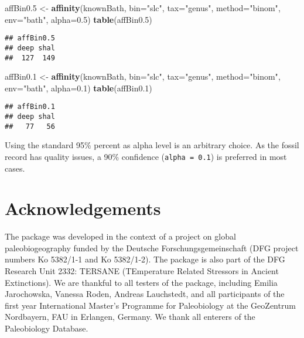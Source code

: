 \documentclass[]{article}
\newenvironment{Shaded}{\begin{snugshade}}{\end{snugshade}}
\newcommand{\KeywordTok}[1]{\textcolor[rgb]{0.13,0.29,0.53}{\textbf{{#1}}}}
\newcommand{\DataTypeTok}[1]{\textcolor[rgb]{0.13,0.29,0.53}{{#1}}}
\newcommand{\FloatTok}[1]{\textcolor[rgb]{0.00,0.00,0.81}{{#1}}}
\newcommand{\StringTok}[1]{\textcolor[rgb]{0.31,0.60,0.02}{{#1}}}
\newcommand{\NormalTok}[1]{{#1}}
\begin{document}
\begin{Shaded}
\begin{Highlighting}[]
\NormalTok{affBin0}\FloatTok{.5} \NormalTok{<-}\StringTok{ }\KeywordTok{affinity}\NormalTok{(knownBath, }\DataTypeTok{bin=}\StringTok{"slc"}\NormalTok{, }\DataTypeTok{tax=}\StringTok{"genus"}\NormalTok{, }
  \DataTypeTok{method=}\StringTok{"binom"}\NormalTok{, }\DataTypeTok{env=}\StringTok{"bath"}\NormalTok{, }\DataTypeTok{alpha=}\FloatTok{0.5}\NormalTok{)}
\KeywordTok{table}\NormalTok{(affBin0}\FloatTok{.5}\NormalTok{)}
\end{Highlighting}
\end{Shaded}

\begin{verbatim}
## affBin0.5
## deep shal 
##  127  149
\end{verbatim}

\begin{Shaded}
\begin{Highlighting}[]
\NormalTok{affBin0}\FloatTok{.1} \NormalTok{<-}\StringTok{ }\KeywordTok{affinity}\NormalTok{(knownBath, }\DataTypeTok{bin=}\StringTok{"slc"}\NormalTok{, }\DataTypeTok{tax=}\StringTok{"genus"}\NormalTok{, }
  \DataTypeTok{method=}\StringTok{"binom"}\NormalTok{, }\DataTypeTok{env=}\StringTok{"bath"}\NormalTok{, }\DataTypeTok{alpha=}\FloatTok{0.1}\NormalTok{)}
\KeywordTok{table}\NormalTok{(affBin0}\FloatTok{.1}\NormalTok{)}
\end{Highlighting}
\end{Shaded}

\begin{verbatim}
## affBin0.1
## deep shal 
##   77   56
\end{verbatim}

Using the standard 95\% percent as alpha level is an arbitrary choice.
As the fossil record has quality issues, a 90\% confidence
(\texttt{alpha\ =\ 0.1}) is preferred in most cases.

\section{Acknowledgements}\label{acknowledgements}

The package was developed in the context of a project on global
paleobiogeography funded by the Deutsche Forschungsgemeinschaft (DFG
project numbers Ko 5382/1-1 and Ko 5382/1-2). The package is also part
of the DFG Research Unit 2332: TERSANE (TEmperature Related Stressors in
Ancient Extinctions). We are thankful to all testers of the package,
including Emilia Jarochowska, Vanessa Roden, Andreas Lauchstedt, and all
participants of the first year International Master's Programme for
Paleobiology at the GeoZentrum Nordbayern, FAU in Erlangen, Germany. We
thank all enterers of the Paleobiology Database.
\end{document}
